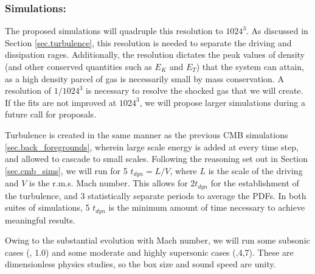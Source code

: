 \subsubsection{Simulations: \nameTurbulence}
\label{subsec.turb_sims}

The proposed simulations will quadruple this
resolution to $1024^3$.  As discussed in Section \ref{sec.turbulence},
this resolution is needed to separate the driving and dissipation rages.  
Additionally, the resolution dictates the peak values of density (and other
conserved quantities such as $E_K$ and $E_T$) that the system can attain, as a
high density parcel of gas is necessarily small by 
mass conservation.  A resolution of $1/1024^3$ is necessary to resolve the
shocked gas that we will create.
If the
fits are not improved at $1024^3$, we will propose larger simulations during a
future call for proposals.

Turbulence is created in the same manner as the previous CMB simulations
\ref{sec.back_foregrounds}, wherein large scale energy is added at every time
step, and allowed to cascade to small scales.  Following the reasoning set out
in Section \ref{sec.cmb_sims}, we will run for 5 $t_{dyn}=L/V$, where $L$ is the
scale of the driving and $V$ is the r.m.s. Mach number.  This allows for $2
t_{dyn}$ for the establishment of the turbulence, and 3 statistically separate
periods to average the PDFs.  In both suites of simulations, 5 $t_{dyn}$ is the minimum
amount of time necessary to achieve meaningful results.

Owing to the substantial evolution with Mach number, we
will run some subsonic cases (, 1.0) and some moderate and highly
supersonic cases (,4,7).   These are dimensionless physics
studies, so the box size and sound speed are unity.
